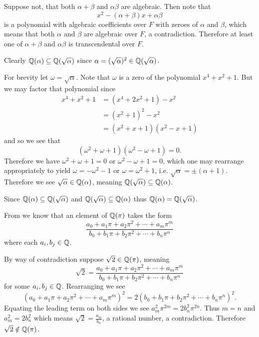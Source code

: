 \begin{questions}
\begin{partquestions}{\roman*}
        \item Suppose not, that both $\alpha + \beta$ and $\alpha\beta$ are algebraic. Then note that
        \[
            x^2 - (\alpha+\beta)x + \alpha\beta
        \]
        is a polynomial with algebraic coefficients over $F$ with zeroes of $\alpha$ and $\beta$, which means that both $\alpha$ and $\beta$ are algebraic over $F$, a contradiction. Therefore at least one of $\alpha + \beta$ and $\alpha\beta$ is transcendental over $F$.
    \end{partquestions}

    \item Clearly $\mathbb{Q}(\alpha) \subseteq \mathbb{Q}(\sqrt\alpha)$ since $\alpha = (\sqrt\alpha)^2 \in \mathbb{Q}(\sqrt\alpha)$.

    For brevity let $\omega = \sqrt\alpha$. Note that $\omega$ is a zero of the polynomial $x^4+x^2+1$. But we may factor that polynomial since
    \begin{align*}
        x^4 + x^2 + 1 &= (x^4 + 2x^2 + 1) - x^2\\
        &= (x^2+1)^2 - x^2\\
        &= (x^2+x+1)(x^2-x+1)
    \end{align*}
    and so we see that
    \[
        (\omega^2+\omega+1)(\omega^2-\omega+1) = 0.
    \]
    Therefore we have $\omega^2+\omega+1 = 0$ or $\omega^2-\omega+1 = 0$, which one may rearrange appropriately to yield $\omega = -\omega^2-1$ or $\omega = \omega^2 + 1$, i.e. $\sqrt\alpha = \pm(\alpha+1)$. Therefore we see $\sqrt\alpha \in \mathbb{Q}(\alpha)$, meaning $\mathbb{Q}(\sqrt\alpha) \subseteq \mathbb{Q}(\alpha)$.

    Since $\mathbb{Q}(\alpha) \subseteq \mathbb{Q}(\sqrt\alpha)$ and $\mathbb{Q}(\sqrt\alpha) \subseteq \mathbb{Q}(\alpha)$ thus $\mathbb{Q}(\alpha) = \mathbb{Q}(\sqrt\alpha)$.

    \item From  we know that an element of $\mathbb{Q}(\pi)$ takes the form
    \[
        \frac{a_0 + a_1\pi + a_2\pi^2 + \cdots + a_m\pi^m}{b_0 + b_1\pi + b_2\pi^2 + \cdots + b_n\pi^n}
    \]
    where each $a_i, b_j \in \mathbb{Q}$.

    By way of contradiction suppose $\sqrt2 \in \mathbb{Q}(\pi)$, meaning
    \[
        \sqrt2 = \frac{a_0 + a_1\pi + a_2\pi^2 + \cdots + a_m\pi^m}{b_0 + b_1\pi + b_2\pi^2 + \cdots + b_n\pi^n}
    \]
    for some $a_i, b_j \in \mathbb{Q}$. Rearranging we see
    \[
        \left(a_0 + a_1\pi + a_2\pi^2 + \cdots + a_m\pi^m\right)^2 = 2\left(b_0 + b_1\pi + b_2\pi^2 + \cdots + b_n\pi^n\right)^2.
    \]
    Equating the leading term on both sides we see $a_m^2\pi^{2m} = 2b_n^2\pi^{2n}$. Thus $m = n$ and $a_m^2 = 2b_n^2$ which means $\sqrt2 = \frac{a_m}{b_n}$, a rational number, a contradiction. Therefore $\sqrt2 \notin \mathbb{Q}(\pi)$.


\end{questions}
